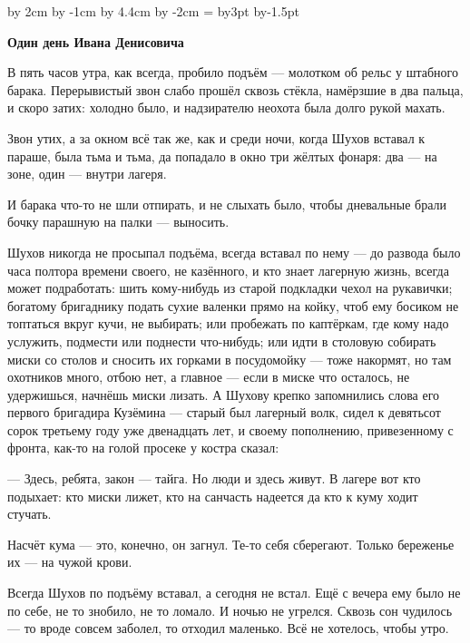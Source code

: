 \raggedbottom
\advance\hsize by 2cm
\advance\pdfhorigin by -1cm
\advance\vsize by 4.4cm
\advance\pdfvorigin by -2cm
\footline={\hfil{}}
 
\advance\hsize by3pt
\advance\pdfhorigin by-1.5pt

\centerline{\bf Один день Ивана Денисовича}

\bigskip

В пять часов утра, как всегда, пробило подъём --- молотком об рельс у штабного барака. 
Перерывистый звон слабо прошёл сквозь стёкла, намёрзшие в два пальца, и скоро затих: холодно 
было, и надзирателю неохота была долго рукой махать.

Звон утих, а за окном всё так же, как и среди ночи, когда Шухов вставал к параше, была тьма и 
тьма, да попадало в окно три жёлтых фонаря: два --- на зоне, один --- внутри лагеря.

И барака что-то не шли отпирать, и не слыхать было, чтобы дневальные брали бочку парашную на 
палки --- выносить.

Шухов никогда не просыпал подъёма, всегда вставал по нему --- до развода было часа полтора 
времени своего, не казённого, и кто знает лагерную жизнь, всегда может подработать: шить 
кому-нибудь из старой подкладки чехол на рукавички; богатому бригаднику подать сухие 
валенки прямо на койку, чтоб ему босиком не топтаться вкруг кучи, не выбирать; или пробежать 
по каптёркам, где кому надо услужить, подмести или поднести что-нибудь; или идти в столовую 
собирать миски со столов и сносить их горками в посудомойку --- тоже накормят, но там 
охотников много, отбою нет, а главное --- если в миске что осталось, не удержишься, начнёшь 
миски лизать. А Шухову крепко запомнились слова его первого бригадира Кузёмина --- старый был 
лагерный волк, сидел к девятьсот сорок третьему году уже двенадцать лет, и своему 
пополнению, привезенному с фронта, как-то на голой просеке у костра сказал:

--- Здесь, ребята, закон --- тайга. Но люди и здесь живут. В лагере вот кто подыхает: кто миски 
лижет, кто на санчасть надеется да кто к куму ходит стучать.

Насчёт кума --- это, конечно, он загнул. Те-то себя сберегают. Только береженье их --- на чужой 
крови.

Всегда Шухов по подъёму вставал, а сегодня не встал. Ещё с вечера ему было не по себе, не то 
знобило, не то ломало. И ночью не угрелся. Сквозь сон чудилось --- то вроде совсем заболел, то 
отходил маленько. Всё не хотелось, чтобы утро.


